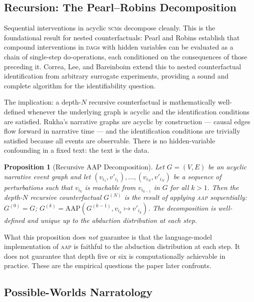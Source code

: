 \documentclass[11pt]{article}
\theoremstyle{rukha}
\newtheorem{proposition}{Proposition}
\begin{document}
\subsection{Recursion: The Pearl–Robins Decomposition}

Sequential interventions in acyclic \textsc{scm}s decompose cleanly.
This is the foundational result for nested counterfactuals: Pearl and
Robins \cite{pearlrobins} establish that compound interventions in
\textsc{dag}s with hidden variables can be evaluated as a chain of
single-step do-operations, each conditioned on the consequences of those
preceding it. Correa, Lee, and Bareinboim \cite{correaleebareinboim}
extend this to nested counterfactual identification from arbitrary
surrogate experiments, providing a sound and complete algorithm for the
identifiability question.

The implication: a depth-$N$ recursive counterfactual is mathematically
well-defined whenever the underlying graph is acyclic and the
identification conditions are satisfied. Rukha's narrative graphs are
acyclic by construction --- causal edges flow forward in narrative time
--- and the identification conditions are trivially satisfied because
all events are observable. There is no hidden-variable confounding in a
fixed text: the text is the data.

\begin{proposition}[Recursive AAP Decomposition]
Let $G = (V, E)$ be an acyclic narrative event graph and let
$(v_{i_1}, v'_{i_1}), \dots, (v_{i_N}, v'_{i_N})$ be a sequence of
perturbations such that $v_{i_k}$ is reachable from $v_{i_{k-1}}$ in $G$
for all $k > 1$. Then the depth-$N$ recursive counterfactual
$G^{(N)}$ is the result of applying \textsc{aap} sequentially:
$G^{(0)} = G$;
$G^{(k)} = \mathrm{AAP}(G^{(k-1)}, v_{i_k} \mapsto v'_{i_k})$.
The decomposition is well-defined and unique up to the abduction
distribution at each step.
\end{proposition}

What this proposition does \emph{not} guarantee is that the
language-model implementation of \textsc{aap} is faithful to the
abduction distribution at each step. It does not guarantee that depth
five or six is computationally achievable in practice. These are the
empirical questions the paper later confronts.

\subsection{Possible-Worlds Narratology}
\end{document}
